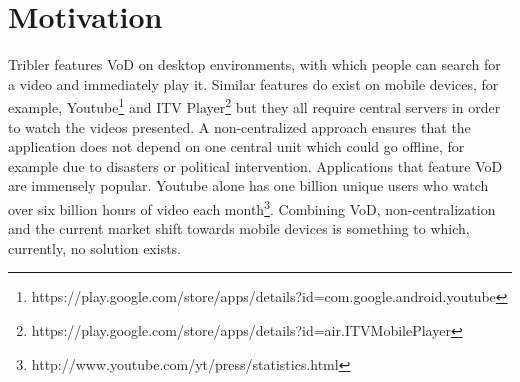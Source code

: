 \section{Motivation}
\label{sec:motivation}
Tribler features VoD on desktop environments, with which people can search for a video and immediately play it. Similar features do exist on mobile devices, for example, Youtube\footnote{https://play.google.com/store/apps/details?id=com.google.android.youtube} and ITV Player\footnote{https://play.google.com/store/apps/details?id=air.ITVMobilePlayer} but they all require central servers in order to watch the videos presented. A non-centralized approach ensures that the application does not depend on one central unit which could go offline, for example due to disasters or political intervention. Applications that feature VoD are immensely popular. Youtube alone has one billion unique users who watch over six billion hours of video each month\footnote{http://www.youtube.com/yt/press/statistics.html}. Combining VoD, non-centralization and the current market shift towards mobile devices is something to which, currently, no solution exists.